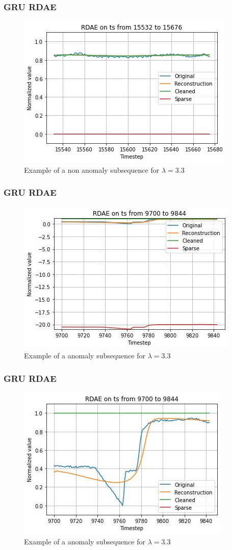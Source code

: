 \documentclass{beamer}
\theoremstyle{plain}
\theoremstyle{definition}
\theoremstyle{remark}
\begin{document}
\begin{frame}
	\frametitle{GRU RDAE}
	\begin{figure}
		\centering
		\includegraphics[width=0.7\linewidth]{Images/GRUlam3.3ts_non_anomalyzoom15532.jpg}
		\caption[]{Example of a non anomaly subsequence for $\lambda=3.3$}
	\end{figure}
\end{frame}

\begin{frame}
	\frametitle{GRU RDAE}
	\begin{figure}
		\centering
		\includegraphics[width=0.7\linewidth]{Images/GRUlam3.3ts_anomaly9700.jpg}
		\caption[]{Example of a anomaly subsequence for $\lambda=3.3$}
	\end{figure}
\end{frame}

\begin{frame}
	\frametitle{GRU RDAE}
	\begin{figure}
		\centering
		\includegraphics[width=0.7\linewidth]{Images/GRUlam3.3ts_anomalyzoom9700.jpg}
		\caption[]{Example of a anomaly subsequence for $\lambda=3.3$}
	\end{figure}
\end{frame}
\end{document}

